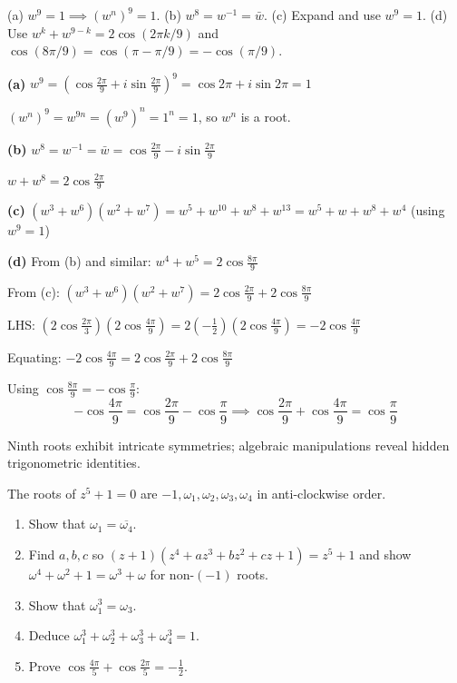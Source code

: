 \vspace{0.5cm}
\begin{hintbox}
(a) $w^9=1 \implies (w^n)^9=1$. (b) $w^8=w^{-1}=\bar{w}$. (c) Expand and use $w^9=1$. (d) Use $w^k+w^{9-k}=2\cos(2\pi k/9)$ and $\cos(8\pi/9)=\cos(\pi-\pi/9)=-\cos(\pi/9)$.
\end{hintbox}

\begin{solution}
\textbf{(a)} $w^9 = (\cos\frac{2\pi}{9}+i\sin\frac{2\pi}{9})^9 = \cos 2\pi + i\sin 2\pi = 1$

$(w^n)^9 = w^{9n} = (w^9)^n = 1^n = 1$, so $w^n$ is a root.

\textbf{(b)} $w^8 = w^{-1} = \bar{w} = \cos\frac{2\pi}{9} - i\sin\frac{2\pi}{9}$

$w+w^8 = 2\cos\frac{2\pi}{9}$

\textbf{(c)} $(w^3+w^6)(w^2+w^7) = w^5+w^{10}+w^8+w^{13} = w^5+w+w^8+w^4$ (using $w^9=1$)

\textbf{(d)} From (b) and similar: $w^4+w^5 = 2\cos\frac{8\pi}{9}$

From (c): $(w^3+w^6)(w^2+w^7) = 2\cos\frac{2\pi}{9} + 2\cos\frac{8\pi}{9}$

LHS: $(2\cos\frac{2\pi}{3})(2\cos\frac{4\pi}{9}) = 2(-\frac{1}{2})(2\cos\frac{4\pi}{9}) = -2\cos\frac{4\pi}{9}$

Equating: $-2\cos\frac{4\pi}{9} = 2\cos\frac{2\pi}{9} + 2\cos\frac{8\pi}{9}$

Using $\cos\frac{8\pi}{9} = -\cos\frac{\pi}{9}$:
$$
-\cos\frac{4\pi}{9} = \cos\frac{2\pi}{9} - \cos\frac{\pi}{9} \implies \cos\frac{2\pi}{9} + \cos\frac{4\pi}{9} = \cos\frac{\pi}{9}
$$

\end{solution}

\begin{takeaways}
Ninth roots exhibit intricate symmetries; algebraic manipulations reveal hidden trigonometric identities.
\end{takeaways}

\vspace{1cm}

\begin{problem}
The roots of $z^5 + 1 = 0$ are $-1, \omega_1, \omega_2, \omega_3, \omega_4$ in anti-clockwise order.
\begin{enumerate}
    \item Show that $\omega_1 = \overline{\omega_4}$.
    \item Find $a, b, c$ so $(z + 1)(z^4 + az^3 + bz^2 + cz + 1) = z^5 + 1$ and show $\omega^4 + \omega^2 + 1 = \omega^3 + \omega$ for non-$(-1)$ roots.
    \item Show that $\omega_1^3 = \omega_3$.
    \item Deduce $\omega_1^3 + \omega_2^3 + \omega_3^3 + \omega_4^3 = 1$.
    \item Prove $\cos\frac{4\pi}{5} + \cos\frac{2\pi}{5} = -\frac{1}{2}$.
\end{enumerate}
\end{problem}

